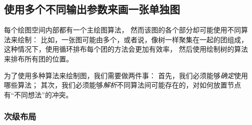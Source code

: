 




\subsection{使用多个不同输出参数来画一张单独图}

\label{section-gd-sublayouts}

每个绘图空间内部都有一个主绘图算法，
然而该图的各个部分却可能使用不同算法来绘制：
比如，一张图可能由多个，或者说，像树一样聚集在一起的团组成，
这种情况下，使用循环排布每个团的方法会更加有效率，
然后使用绘制树的算法来排布所有团的位置。

为了使用多种算法来绘制图，我们需要做两件事：
首先，我们必须能够\emph{确定}使用哪些算法；
其次，我们必须能够\emph{解析}不同算法间可能存在的，对如何放置节点有``不同想法''的冲突。


\subsubsection{次级布局}

